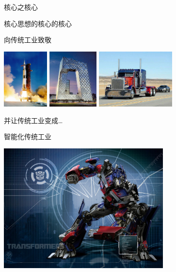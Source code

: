 \documentclass[]{beamer}
\begin{document}
\begin{frame}{核心之核心}
  \begin{block}{核心思想的核心的核心}
    \begin{center}
      \Huge 向传统工业致敬
    \end{center}
  \end{block}
  \begin{center}
    \includegraphics[height=3cm]{spacecraft.jpg}
    \includegraphics[height=3cm]{cctv.jpg}
    \includegraphics[height=3cm]{prime_trunk.jpg}

    并让传统工业变成\dots
  \end{center}
\end{frame}

\begin{frame}{智能化传统工业}
  \begin{center}
    \includegraphics[height=6.5cm]{prime_robot.jpg}
  \end{center}
\end{frame}
\end{document}
